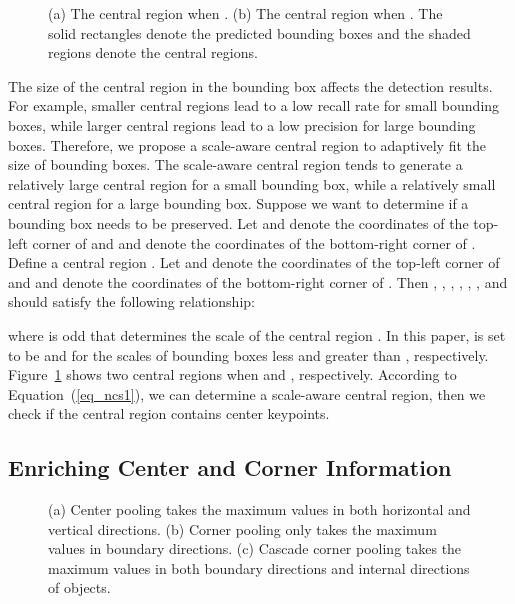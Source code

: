 \documentclass[10pt,twocolumn,letterpaper]{article}
\begin{document}
\begin{figure}[tb]
  \centering 
  \vspace{-2ex}
  \caption{(a) The central region when . (b) The central region when . The solid rectangles denote the predicted bounding boxes and the shaded regions denote the central regions.}
  \label{fig_ncs}
\end{figure}
The size of the central region in the bounding box affects the detection results. For example, smaller central regions lead to a low recall rate for small bounding boxes, while larger central regions lead to a low precision for large bounding boxes. Therefore, we propose a scale-aware central region to adaptively fit the size of bounding boxes. The scale-aware central region tends to generate a relatively large central region for a small bounding box, while a relatively small central region for a large bounding box. Suppose we want to determine if a bounding box  needs to be preserved. Let  and  denote the coordinates of the top-left corner of  and  and  denote the coordinates of the bottom-right corner of . Define a central region . Let  and  denote the coordinates of the top-left corner of  and  and  denote the coordinates of the bottom-right corner of . Then , , , , , ,  and  should satisfy the following relationship:

where  is odd that determines the scale of the central region . In this paper,  is set to be  and  for the scales of bounding boxes less and greater than , respectively. Figure~\ref{fig_ncs} shows two central regions when  and , respectively. According to Equation~(\ref{eq_ncs1}), we can determine a scale-aware central region, then we check if the central region contains center keypoints.

\subsection{Enriching Center and Corner Information}\label{Enriching}

\begin{figure}[tb]
  \centering 
  \vspace{-2ex}
  \caption{(a) Center pooling takes the maximum values in both horizontal and vertical directions. (b) Corner pooling only takes the maximum values in boundary directions. (c) Cascade corner pooling takes the maximum values in both boundary directions and internal directions of objects.} 
  \label{fig_cornerpooling}
  \vspace{-3ex}
\end{figure}
\end{document}
